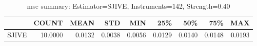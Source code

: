 \begin{table}[ht]
\centering
\caption{mse summary: Estimator=SJIVE, Instruments=142, Strength=0.40}
\begin{tabular}{lrrrrrrrr}
\toprule
 & COUNT & MEAN & STD & MIN & 25\% & 50\% & 75\% & MAX \\
\midrule
SJIVE & 10.0000 & 0.0132 & 0.0038 & 0.0056 & 0.0129 & 0.0140 & 0.0148 & 0.0193 \\
\bottomrule
\end{tabular}
\end{table}
